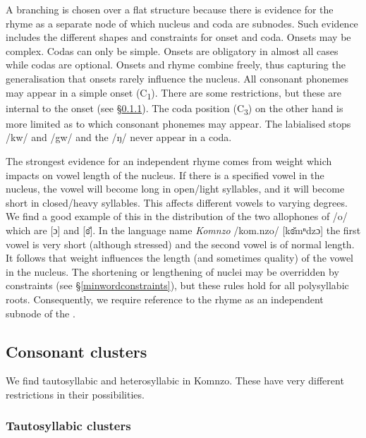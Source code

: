 A branching  is chosen over a flat structure because there is evidence for the rhyme as a separate node of which nucleus and coda are subnodes. Such evidence includes the different shapes and constraints for onset and coda. Onsets may be complex. Codas can only be simple. Onsets are obligatory in almost all cases while codas are optional. Onsets and rhyme combine freely, thus capturing the generalisation that onsets rarely influence the nucleus. All consonant phonemes may appear in a simple onset (C\textsubscript{1}). There are some restrictions, but these are internal to the onset (see \S{}\ref{tautosyllabiccc}). The coda position (C\textsubscript{3}) on the other hand is more limited as to which consonant phonemes may appear. The labialised  stops /kw/ and /gw/ and the   /ŋ/ never appear in a coda.%

The strongest evidence for an independent rhyme comes from  weight which impacts on vowel length of the nucleus. If there is a specified vowel in the nucleus, the vowel will become long in open/light syllables, and it will become short in closed/heavy syllables. This affects different vowels to varying degrees. We find a good example of this in the distribution of the two allophones of /o/ which are [ɔ] and [ɞ̆]. In the language name \emph{Komnzo} /kom.nzo/ [kɞ̆mⁿdzɔ] the first vowel is very short (although stressed) and the second vowel is of normal length. It follows that  weight influences the length (and sometimes quality) of the vowel in the nucleus. The shortening or lengthening of nuclei may be overridden by  constraints (see \S{}\ref{minwordconstraints}), but these rules hold for all polysyllabic roots. Consequently, we require reference to the rhyme as an independent subnode of the .

\subsection{Consonant clusters} \label{consonantclusters}

We find tautosyllabic and heterosyllabic  in Komnzo. These have very different restrictions in their possibilities.

\subsubsection{Tautosyllabic clusters} \label{tautosyllabiccc}

